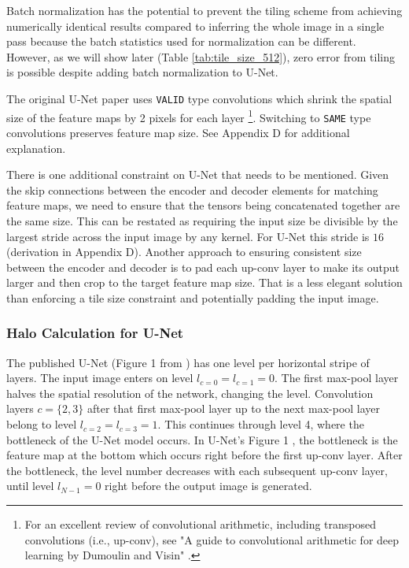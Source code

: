 \documentclass[runningheads]{llncs}
\begin{document}
Batch normalization has the potential to prevent the tiling scheme from achieving numerically identical results compared to inferring the whole image in a single pass because the batch statistics used for normalization can be different. However, as we will show later (Table \ref{tab:tile_size_512}), zero error from tiling is possible despite adding batch normalization to U-Net.

The original U-Net paper uses \texttt{VALID} type convolutions which shrink the spatial size of the feature maps by 2 pixels for each layer \cite{Dumoulin2018}\footnote{For an excellent review of convolutional arithmetic, including transposed convolutions (i.e., up-conv), see "A guide to convolutional arithmetic for deep learning by Dumoulin and Visin" \cite{Dumoulin2018}.}. Switching to \texttt{SAME} type convolutions preserves feature map size. See Appendix D for additional explanation. 

There is one additional constraint on U-Net that needs to be mentioned. Given the skip connections between the encoder and decoder elements for matching feature maps, we need to ensure that the tensors being concatenated together are the same size. This can be restated as requiring the input size be divisible by the largest stride across the input image by any kernel. For U-Net this stride is $16$ (derivation in Appendix D). Another approach to ensuring consistent size between the encoder and decoder is to pad each up-conv layer to make its output larger and then crop to the target feature map size. That is a less elegant solution than enforcing a tile size constraint and potentially padding the input image.


\subsubsection{Halo Calculation for U-Net}

The published U-Net (Figure 1 from \cite{Ronneberger2015a}) has one level per horizontal stripe of layers. The input image enters on level $l_{c=0} = l_{c=1} = 0$. The first max-pool layer halves the spatial resolution of the network, changing the level. Convolution layers $c = \{2, 3\}$ after that first max-pool layer up to the next max-pool layer belong to level $l_{c=2}=l_{c=3} = 1$. This continues through level 4, where the bottleneck of the U-Net model occurs. In U-Net's Figure 1 \cite{Ronneberger2015a}, the bottleneck is the feature map at the bottom which occurs right before the first up-conv layer. After the bottleneck, the level number decreases with each subsequent up-conv layer, until level $l_{N-1} = 0$ right before the output image is generated. 
\end{document}
